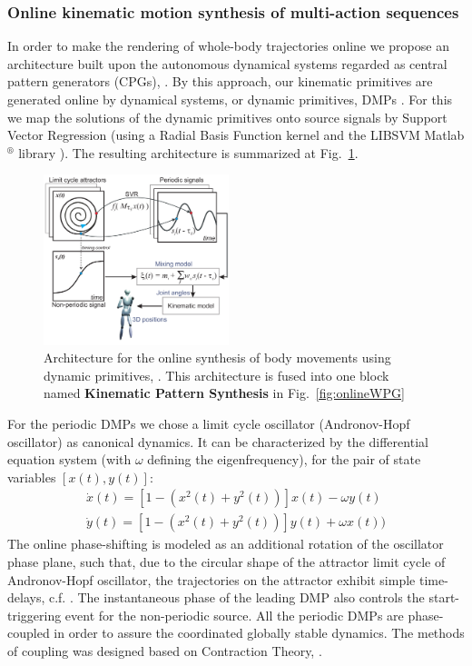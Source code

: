 \subsubsection*{Online kinematic motion synthesis of multi-action sequences}

In order to make the rendering of whole-body trajectories online we propose an architecture built upon the
autonomous dynamical systems regarded as central pattern generators (CPGs), \cite{ref:gie09}. By this approach, our kinematic primitives
are generated online by dynamical systems, or dynamic primitives, DMPs \cite{ref:buc06, ref:inhps13}.
For this we map the solutions of the dynamic primitives onto source signals by Support Vector Regression (using a Radial
Basis Function kernel and the LIBSVM Matlab$^{\circledR}$ library \cite{ref:cha01}). The resulting architecture is summarized at
Fig.~\ref{fig:KinemPrimitivesArchitecture}.

\begin{figure}
  \centering
  \includegraphics[width=0.48\textwidth]{Graph_syst.pdf}
  \caption{Architecture for the online synthesis of body movements using dynamic primitives, \cite{ref:gie09}. This architecture is fused into one block named \textbf{Kinematic Pattern Synthesis} in Fig.~\ref{fig:onlineWPG} }
\label{fig:KinemPrimitivesArchitecture}
\end{figure}

For the periodic DMPs we chose a limit cycle oscillator (Andronov-Hopf oscillator) as canonical dynamics. It can be characterized by the differential equation system (with $\omega$ defining the eigenfrequency), for the pair of state variables $[x(t),y(t)]$:
\begin{eqnarray*}
\dot{x}(t) =[1-(x^2(t)+y^2(t))]x(t)-\omega y(t)\\
\dot{y}(t) =[1-(x^2(t)+y^2(t))]y(t)+\omega x(t))
\label{hopfosccoupl}
\end{eqnarray*}	
The online phase-shifting is modeled as an additional rotation of the oscillator phase plane, such that, due to the circular shape
of the attractor limit cycle of Andronov-Hopf oscillator, the trajectories on the attractor exhibit simple time-delays, c.f. \cite{ref:gie09}.
The instantaneous phase of the leading DMP also controls the start-triggering event for the non-periodic source. All the periodic DMPs
are phase-coupled in order to assure the coordinated globally stable dynamics. The methods of coupling was designed based on Contraction Theory, \cite{ref:par09}.

